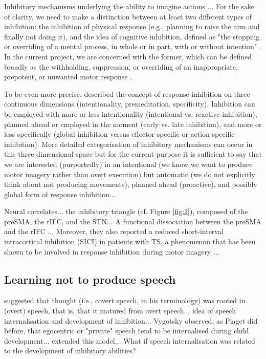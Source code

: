 \documentclass[utf8]{template/frontiersSCNS} %
\begin{document}
Inhibitory mechanisms underlying the ability to imagine actions \citep{guillot_imagining_2012, schwoebel_man_2002}... For the sake of clarity, we need to make a distinction between at least two different types of inhibition: the inhibition of physical response (e.g., planning to raise the arm and finally not doing it), and the idea of cognitive inhibition, defined as "the stopping or overriding of a mental process, in whole or in part, with or without intention" \citep{gorfein_concept_2007}. In the current project, we are concerned with the former, which can be defined broadly as the withholding, suppression, or overriding of an inappropriate, prepotent, or unwanted motor response \citep{aron_neural_2007, oshea_go_2018}.

To be even more precise, \cite{ridderinkhof_dont_2014} described the concept of response inhibition on three continuous dimensions (intentionality, premeditation, specificity). Inhibition can be employed with more or less intentionality (intentional vs. reactive inhibition), planned ahead or employed in the moment (early vs. late inhibition), and more or less specifically (global inhibition versus effector-specific or action-specific inhibition). More detailed categorisation of inhibitory mechanisms can occur in this three-dimensional space but for the current purpose it is sufficient to say that we are interested (purportedly) in an intentional (we know we want to produce motor imagery rather than overt execution) but automatic (we do not explicitly think about not producing movements), planned ahead (proactive), and possibly global form of response inhibition...

Neural correlates... the inhibitory triangle (cf. Figure \ref{fig:2}), composed of the preSMA, the rIFC, and the STN... A functional dissociation between the preSMA and the rIFC \citep{diesburg_pause-then-cancel_2021}... Moreover, they also reported a reduced short-interval intracortical inhibition (SICI) in patients with TS, a phenomenon that has been shown to be involved in response inhibition during motor imagery \citep{neige_unravelling_2020}...

\subsection{Learning not to produce speech}

\cite{watson_psychology_1919} suggested that thought (i.e., covert speech, in his terminology) was rooted in (overt) speech, that is, that it matured from overt speech... \cite{vygotsky_thought_1934} idea of speech internalisation and development of inhibition... Vygotsky observed, as Piaget did before, that egocentric or "private" speech tend to be internalised during child development... \cite{fernyhough_alien_2004} extended this model... What if speech internalisation was related to the development of inhibitory abilities?
\end{document}
